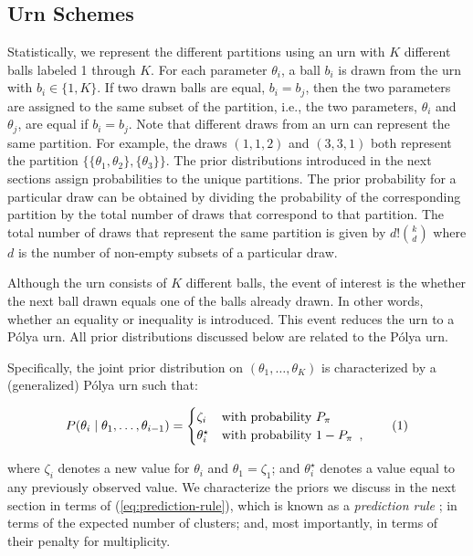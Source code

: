 \documentclass[11pt,a4paper]{article}
\theoremstyle{definition} %
\theoremstyle{case}
\newcommand{\numberthis}{\addtocounter{equation}{1}\tag{\theequation}}
\begin{document}
\subsection{Urn Schemes}
Statistically, we represent the different partitions using an urn with $K$ different balls labeled 1 through $K$. For each parameter $\theta_i$, a ball $b_i$ is drawn from the urn with $b_i \in \{1,K\}$. If two drawn balls are equal, $b_i = b_j$, then the two parameters are assigned to the same subset of the partition, i.e., the two parameters, $\theta_i$ and $\theta_j$, are equal if $b_i = b_j$. Note that different draws from an urn can represent the same partition. For example, the draws $(1, 1, 2)$ and $(3, 3, 1)$ both represent the partition $\{\{\theta_1, \theta_2\}, \{\theta_3\}\}$. The prior distributions introduced in the next sections assign probabilities to the unique partitions. The prior probability for a particular draw can be obtained by dividing the probability of the corresponding partition by the total number of draws that correspond to that partition. The total number of draws that represent the same partition is given by $d!\binom{k}{d}$ where $d$ is the number of non-empty subsets of a particular draw. 

Although the urn consists of $K$ different balls, the event of interest is the whether the next ball drawn equals one of the balls already drawn. In other words, whether an equality or inequality is introduced. This event reduces the urn to a P\'{o}lya urn. All prior distributions discussed below are related to the P\'{o}lya urn.

Specifically, the joint prior distribution on $(\theta_1, \ldots, \theta_K)$ is characterized by a (generalized) P\'{o}lya urn such that:

\begin{equation} \label{eq:prediction-rule}
    P(\theta_i \mid \theta_1, \ldots, \theta_{i - 1}) = \begin{cases}
    \zeta_i & \text{with probability } P_{\pi} \\
    \theta_i^{\star} & \text{with probability }  1- P_{\pi} \enspace ,
    \end{cases} \numberthis
\end{equation}

where $\zeta_i$ denotes a new value for $\theta_i$ and $\theta_1 = \zeta_1$; and $\theta_i^{\star}$ denotes a value equal to any previously observed value. We characterize the priors we discuss in the next section in terms of (\ref{eq:prediction-rule}), which is known as a \textit{prediction rule} \parencite[e.g.,][]{ishwaran2001gibbs}; in terms of the expected number of clusters; and, most importantly, in terms of their penalty for multiplicity.
\end{document}
